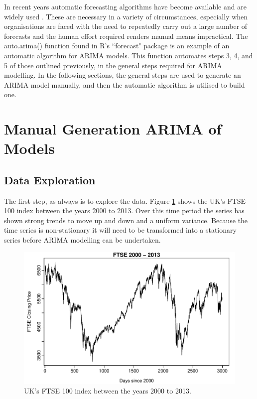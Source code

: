 In recent years automatic forecasting algorithms have become available and are widely used \citep{Hyndman08automatictime}. These are necessary in a variety of circumstances, especially when organisations are faced with the need to repeatedly carry out a large number of forecasts and the human effort required renders manual means impractical. The auto.arima() function found in R's \textquotedblleft forecast" package is an example of an automatic algorithm for ARIMA models. This function automates steps 3, 4, and 5 of those outlined previously, in the general steps required for ARIMA modelling. In the following sections, the general steps are used to generate an ARIMA model manually, and then the automatic algorithm is utilised to build one.

\section{Manual Generation ARIMA of Models}
\label{sec:man_arima}
\subsection{Data Exploration}

The first step, as always is to explore the data. Figure \ref{fig:chp_ts_ftse_2000_13} shows the UK's FTSE 100 index between the years 2000 to 2013. Over this time period the series has shown strong trends to move up and down and a uniform variance. Because the time series is non-stationary it will need to be transformed into a stationary series before ARIMA modelling can be undertaken.

\begin{figure}[tbh]
\centering
\includegraphics{Figures/chp_ts_ftse_2000-13}
\caption[FTSE 100 index between the years 2000 to 2013]{UK's FTSE 100 index between the years 2000 to 2013.}
\label{fig:chp_ts_ftse_2000_13}
\end{figure}

